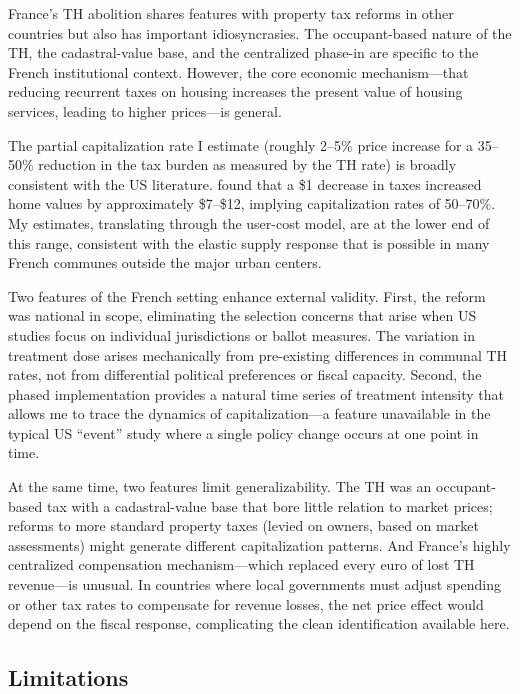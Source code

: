 \documentclass[12pt]{article}
\begin{document}
France's TH abolition shares features with property tax reforms in other countries but also has important idiosyncrasies. The occupant-based nature of the TH, the cadastral-value base, and the centralized phase-in are specific to the French institutional context. However, the core economic mechanism---that reducing recurrent taxes on housing increases the present value of housing services, leading to higher prices---is general.

The partial capitalization rate I estimate (roughly 2--5\% price increase for a 35--50\% reduction in the tax burden as measured by the TH rate) is broadly consistent with the US literature. \citet{oates1969effects} found that a \$1 decrease in taxes increased home values by approximately \$7--\$12, implying capitalization rates of 50--70\%. My estimates, translating through the user-cost model, are at the lower end of this range, consistent with the elastic supply response that is possible in many French communes outside the major urban centers.

Two features of the French setting enhance external validity. First, the reform was national in scope, eliminating the selection concerns that arise when US studies focus on individual jurisdictions or ballot measures. The variation in treatment dose arises mechanically from pre-existing differences in communal TH rates, not from differential political preferences or fiscal capacity. Second, the phased implementation provides a natural time series of treatment intensity that allows me to trace the dynamics of capitalization---a feature unavailable in the typical US ``event'' study where a single policy change occurs at one point in time.

At the same time, two features limit generalizability. The TH was an occupant-based tax with a cadastral-value base that bore little relation to market prices; reforms to more standard property taxes (levied on owners, based on market assessments) might generate different capitalization patterns. And France's highly centralized compensation mechanism---which replaced every euro of lost TH revenue---is unusual. In countries where local governments must adjust spending or other tax rates to compensate for revenue losses, the net price effect would depend on the fiscal response, complicating the clean identification available here.

\subsection{Limitations}
\end{document}
